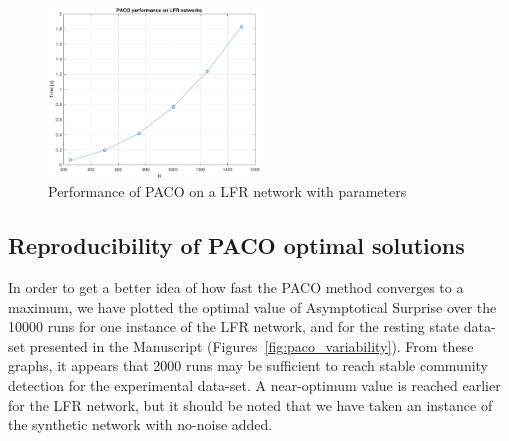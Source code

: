 \begin{figure}[htb!]
\centering
\includegraphics[width=0.5\textwidth]{images/paco_benchmark.pdf}
\caption{Performance of PACO on a LFR network with parameters}
\label{fig:paco_benchmark}
\end{figure}

\subsection{Reproducibility of PACO optimal solutions}
In order to get a better idea of how fast the PACO method converges to a maximum, we have plotted the optimal value of Asymptotical Surprise over the 10000 runs for one instance of the LFR network, and for the resting state data-set presented in the Manuscript (Figures~\ref{fig:paco_variability}).
From these graphs, it appears that 2000 runs may be sufficient to reach stable community detection for the experimental data-set. A near-optimum value is reached earlier for the LFR network, but it should be noted that we have taken an instance of the synthetic network with no-noise added.

